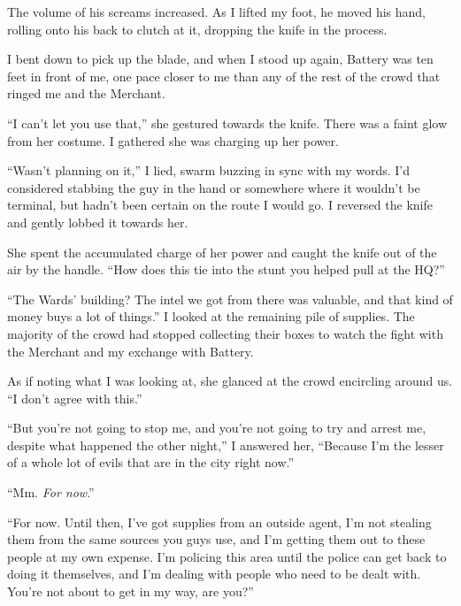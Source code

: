 The volume of his screams increased.  As I lifted my foot, he moved his hand, rolling onto his back to clutch at it, dropping the knife in the process.



I bent down to pick up the blade, and when I stood up again, Battery was ten feet in front of me, one pace closer to me than any of the rest of the crowd that ringed me and the Merchant.



``I can't let you use that,'' she gestured towards the knife.  There was a faint glow from her costume.  I gathered she was charging up her power.



``Wasn't planning on it,'' I lied, swarm buzzing in sync with my words.  I'd considered stabbing the guy in the hand or somewhere where it wouldn't be terminal, but hadn't been certain on the route I would go.  I reversed the knife and gently lobbed it towards her.



She spent the accumulated charge of her power and caught the knife out of the air by the handle. ``How does this tie into the stunt you helped pull at the HQ?''



``The Wards' building?  The intel we got from there was valuable, and that kind of money buys a lot of things.''  I looked at the remaining pile of supplies.  The majority of the crowd had stopped collecting their boxes to watch the fight with the Merchant and my exchange with Battery.



As if noting what I was looking at, she glanced at the crowd encircling around us.  ``I don't agree with this.''



``But you're not going to stop me, and you're not going to try and arrest me, despite what happened the other night,'' I answered her, ``Because I'm the lesser of a whole lot of evils that are in the city right now.''



``Mm.  \emph{For now}.''



``For now.  Until then, I've got supplies from an outside agent, I'm not stealing them from the same sources you guys use, and I'm getting them out to these people at my own expense.  I'm policing this area until the police can get back to doing it themselves, and I'm dealing with people who need to be dealt with.  You're not about to get in my way, are you?''



